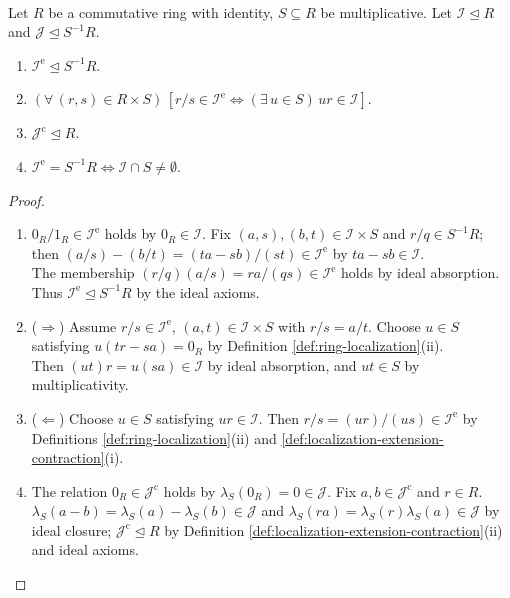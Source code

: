 \begin{proposition} \label{prop:localization-extension-contraction-calculus}
\\
Let $R$ be a commutative ring with identity, $S\subseteq R$ be multiplicative. Let $\mathcal{I}\trianglelefteq R$ and $\mathcal{J}\trianglelefteq S^{-1}R$.
\begin{enumerate}[label=(\roman*)]
\setlength{\itemsep}{0pt}
\item $\mathcal{I}^{\mathrm{e}}\trianglelefteq S^{-1}R$.
\item $(\forall\,(r,s)\in R\times S)\,[r/s\in\mathcal{I}^{\mathrm{e}}\Longleftrightarrow(\exists\,u\in S)\,ur\in\mathcal{I}]$.
\item $\mathcal{J}^{\mathrm{c}}\trianglelefteq R$.
\item $\mathcal{I}^{\mathrm{e}}=S^{-1}R\Longleftrightarrow\mathcal{I}\cap S\neq\emptyset$.
\end{enumerate}
\begin{proof}
\begin{enumerate}[label=(\roman*)]
\setlength{\itemsep}{0pt}
\item[$(i)$] $0_R/1_R\in\mathcal{I}^{\mathrm{e}}$ holds by $0_R\in\mathcal{I}$. Fix $(a,s),(b,t)\in\mathcal{I}\times S$ and $r/q\in S^{-1}R$; then $(a/s)-(b/t)=(ta-sb)/(st)\in\mathcal{I}^{\mathrm{e}}$ by $ta-sb\in\mathcal{I}$.\\
The membership $(r/q)(a/s)=ra/(qs)\in\mathcal{I}^{\mathrm{e}}$ holds by ideal absorption. Thus $\mathcal{I}^{\mathrm{e}}\trianglelefteq S^{-1}R$ by the ideal axioms.
\item[$(ii)$] ($\Rightarrow$) Assume $r/s\in\mathcal{I}^{\mathrm{e}}$, $(a,t)\in\mathcal{I}\times S$ with $r/s=a/t$. Choose $u\in S$ satisfying $u(tr-sa)=0_R$ by Definition \ref{def:ring-localization}(ii).\\
Then $(ut)r=u(sa)\in\mathcal{I}$ by ideal absorption, and $ut\in S$ by multiplicativity.
\item[$(ii)$] ($\Leftarrow$) Choose $u\in S$ satisfying $ur\in\mathcal{I}$. Then $r/s=(ur)/(us)\in\mathcal{I}^{\mathrm{e}}$ by Definitions \ref{def:ring-localization}(ii) and \ref{def:localization-extension-contraction}(i).
\item[$(iii)$] The relation $0_R\in\mathcal{J}^{\mathrm{c}}$ holds by $\lambda_S(0_R)=0\in\mathcal{J}$. Fix $a,b\in\mathcal{J}^{\mathrm{c}}$ and $r\in R$.\\
$\lambda_S(a-b)=\lambda_S(a)-\lambda_S(b)\in\mathcal{J}$ and $\lambda_S(ra)=\lambda_S(r)\lambda_S(a)\in\mathcal{J}$ by ideal closure; $\mathcal{J}^{\mathrm{c}}\trianglelefteq R$ by Definition \ref{def:localization-extension-contraction}(ii) and ideal axioms.

\end{enumerate}
\end{proof}
\end{proposition}
